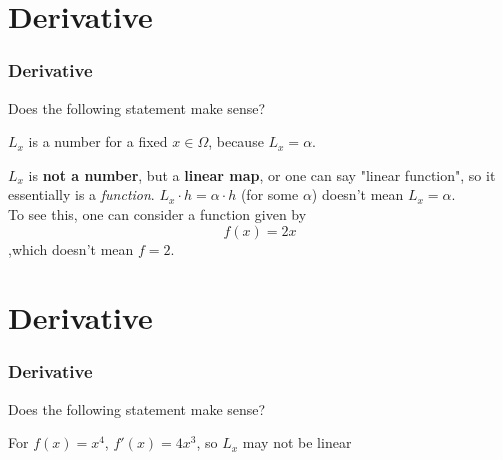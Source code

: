 \documentclass[12pt, t]{beamer}
\renewcommand{\emph}[1]{{\color{Turquoise3}\textsl{#1}}}
\begin{document}
\section{Derivative}
\begin{frame}
    \frametitle{Derivative}
Does the following statement make sense?

\vspace{0.5em}
    \begin{center}
        $L_x$ is a number for a fixed $x\in \Omega$, because $L_x=\alpha$.
    \end{center}
\vspace{0.5em}
\hspace{1em}
$L_x$ is \textbf{not a number}, but a \textbf{linear map}, or one can say "linear function", so it essentially is a \emph{function}.
$L_x\cdot h=\alpha\cdot h$ (for some $\alpha$) doesn't mean $L_x=\alpha$.\\
\hspace{1em} To see this, one can consider a function given by 
\begin{equation*}
    f(x)=2x
\end{equation*}
,which doesn't mean $f=2$.\\

\end{frame}

\section{Derivative}
\begin{frame}
    \frametitle{Derivative}
Does the following statement make sense?

\vspace{0.5em}
    \begin{center}
        For $f(x)=x^4$, $f'(x)=4x^3$, so $L_x$ may not be linear
    \end{center}
\end{frame}
\end{document}
